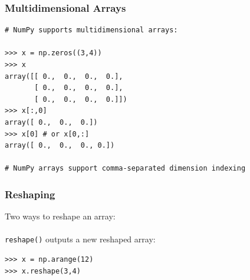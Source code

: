 \begin{frame}[fragile]\frametitle{Multidimensional Arrays}

    \begin{lstlisting}
# NumPy supports multidimensional arrays:

>>> x = np.zeros((3,4))
>>> x
array([[ 0.,  0.,  0.,  0.],
       [ 0.,  0.,  0.,  0.],
       [ 0.,  0.,  0.,  0.]])
>>> x[:,0]
array([ 0.,  0.,  0.])
>>> x[0] # or x[0,:]
array([ 0.,  0.,  0., 0.])

# NumPy arrays support comma-separated dimension indexing

    \end{lstlisting}

\end{frame}

%
%
%
%
%
%

\begin{frame}[fragile]\frametitle{Reshaping}
    Two ways to reshape an array:
    \\~\\
    \lstinline|reshape()| outputs a new reshaped array:
    \begin{lstlisting}
>>> x = np.arange(12)
>>> x.reshape(3,4)
    \end{lstlisting}
%    
\end{frame}

